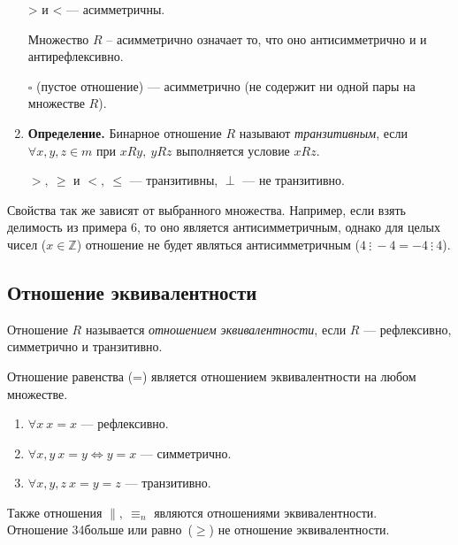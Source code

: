 \documentclass[russian]{lecture-notes}
\begin{document}
\begin{enumerate}
\begin{example}
			\char34> и < --- асимметричны.
		\end{example}
		\begin{proposition}
			Множество $R$ -- асимметрично означает то, что оно антисимметрично и и антирефлексивно.
		\end{proposition}
		\begin{remark}
			$\square$ (пустое отношение) --- асимметрично (не содержит ни одной пары на множестве $R$).
		\end{remark}
		\item \textbf{Определение.} Бинарное отношение $R$ называют \textit{транзитивным}, если $\forall x,y,z \in m$ при $xRy,~yRz$ выполняется условие $xRz$.
		\begin{example}
			\char34$>,~\geq$ и $<,~\leq$ --- транзитивны, $\perp$ --- не транзитивно.
		\end{example}
	\end{enumerate}
	
	\begin{note}
		Свойства так же зависят от выбранного множества. Например, если взять делимость из примера 6, то оно является антисимметричным, однако для целых чисел ($x \in \mathbb{Z}$) отношение не будет являться антисимметричным ($4~\vdots~-4 = -4~\vdots~4$).
	\end{note}
	
	\subsection{Отношение эквивалентности}
	\begin{definition}
		Отношение $R$ называется \textit{отношением эквивалентности}, если $R$ --- рефлексивно, симметрично и транзитивно.
	\end{definition}
	\begin{example}
		Отношение равенства (\char34=) является отношением эквивалентности на любом множестве.
		\begin{enumerate}
			\item $\forall x~x=x$ --- рефлексивно.
			\item $\forall x,y~x=y \Leftrightarrow y=x$ --- симметрично.
			\item $\forall x,y,z~x=y=z$ --- транзитивно.
		\end{enumerate}
		Также отношения $\parallel,~\equiv_n$ являются отношениями эквивалентности.\\
		Отношение \char34больше или равно\char34\ ($\geq$) не отношение эквивалентности.
	\end{example}
	
\end{document}
